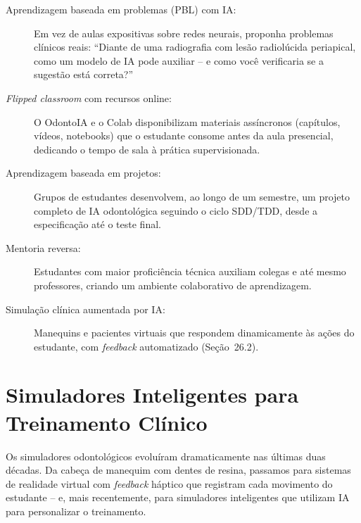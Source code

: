 \begin{description}
  \item[Aprendizagem baseada em problemas (PBL) com IA:] Em vez de aulas
    expositivas sobre redes neurais, proponha problemas clínicos reais:
    ``Diante de uma radiografia com lesão radiolúcida periapical, como um modelo
    de IA pode auxiliar -- e como você verificaria se a sugestão está correta?''

  \item[\textit{Flipped classroom} com recursos online:] O OdontoIA e o
    Colab disponibilizam materiais assíncronos (capítulos, vídeos, notebooks)
    que o estudante consome antes da aula presencial, dedicando o tempo de sala
    à prática supervisionada.

  \item[Aprendizagem baseada em projetos:] Grupos de estudantes desenvolvem,
    ao longo de um semestre, um projeto completo de IA odontológica seguindo o
    ciclo SDD/TDD, desde a especificação até o teste final.

  \item[Mentoria reversa:] Estudantes com maior proficiência técnica auxiliam
    colegas e até mesmo professores, criando um ambiente colaborativo de
    aprendizagem.

  \item[Simulação clínica aumentada por IA:] Manequins e pacientes virtuais que
    respondem dinamicamente às ações do estudante, com \textit{feedback}
    automatizado (Seção~26.2).
\end{description}

\section{Simuladores Inteligentes para Treinamento Clínico}
\label{sec:simuladores}

\nivelquatro

Os simuladores odontológicos evoluíram dramaticamente nas últimas duas décadas.
Da cabeça de manequim com dentes de resina, passamos para sistemas de realidade
virtual com \textit{feedback} háptico que registram cada movimento do estudante
-- e, mais recentemente, para simuladores inteligentes que utilizam IA para
personalizar o treinamento.


